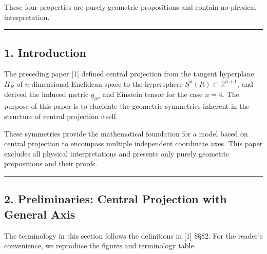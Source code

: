 \documentclass[a4paper,11pt]{article}
\theoremstyle{definition}
\begin{document}
These four properties are purely geometric propositions and contain no physical interpretation.

\begin{center}\rule{0.5\linewidth}{0.5pt}\end{center}

\subsection{1. Introduction}\label{introduction}

The preceding paper {[}1{]} defined central projection from the tangent hyperplane \(\Pi_R\) of \(n\)-dimensional Euclidean space to the hypersphere \(S^n(R) \subset \mathbb{R}^{n+1}\), and derived the induced metric \(g_{\mu\nu}\) and Einstein tensor for the case \(n = 4\). The purpose of this paper is to elucidate the geometric symmetries inherent in the structure of central projection itself.

These symmetries provide the mathematical foundation for a model based on central projection to encompass multiple independent coordinate axes. This paper excludes all physical interpretations and presents only purely geometric propositions and their proofs.

\begin{center}\rule{0.5\linewidth}{0.5pt}\end{center}

\subsection{2. Preliminaries: Central Projection with General Axis}\label{preliminaries-central-projection-with-general-axis}

The terminology in this section follows the definitions in {[}1{]} \$\S\$2. For the reader's convenience, we reproduce the figures and terminology table.
\end{document}

